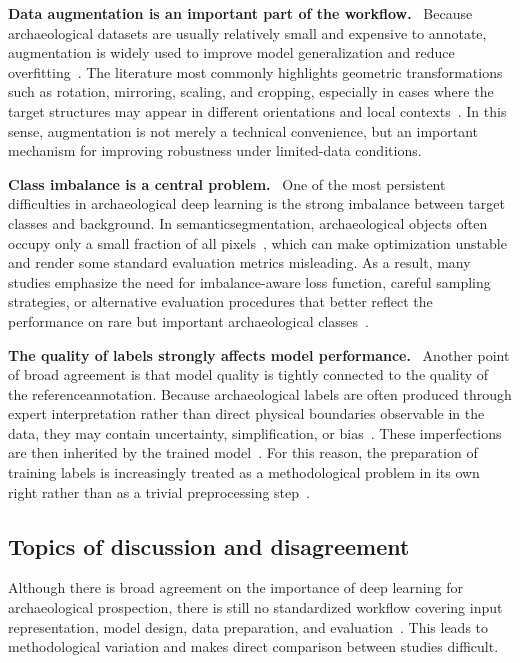 \textbf{Data augmentation is an important part of the workflow.}~\cite{zhang_unveiling_2024,guyot_objective_2021}
Because archaeological datasets are usually relatively small and expensive to annotate, augmentation is widely used to improve model generalization and reduce overfitting~\cite{guyot_objective_2021,diakogiannis_resunet-_2020}. The literature most commonly highlights geometric transformations such as rotation, mirroring, scaling, and cropping, especially in cases where the target structures may appear in different orientations and local contexts~\cite{zhang_unveiling_2024,trier_using_2019}. In this sense, augmentation is not merely a technical convenience, but an important mechanism for improving robustness under limited-data conditions.

\textbf{Class imbalance is a central problem.}~\cite{zhang_unveiling_2024,zhou_dynamic_2023}
One of the most persistent difficulties in archaeological deep learning is the strong imbalance between target classes and background. In \gls{semanticsegmentation}, archaeological objects often occupy only a small fraction of all pixels~\cite{zhang_unveiling_2024,griffiths_improving_2019}, which can make optimization unstable and render some standard evaluation metrics misleading. As a result, many studies emphasize the need for imbalance-aware loss function, careful sampling strategies, or alternative evaluation procedures that better reflect the performance on rare but important archaeological classes~\cite{azarkhordad_detecting_2025,fiorucci_deep_2022}.

\textbf{The quality of labels strongly affects model performance.}~\cite{griffiths_improving_2019,bundzel_semantic_2020}
Another point of broad agreement is that model quality is tightly connected to the quality of the \gls{referenceannotation}. Because archaeological labels are often produced through expert interpretation rather than direct physical boundaries observable in the data, they may contain uncertainty, simplification, or bias~\cite{cowley_what_2016,bundzel_semantic_2020}. These imperfections are then inherited by the trained model~\cite{rahaman_effects_2022,burgert_effects_2022}. For this reason, the preparation of training labels is increasingly treated as a methodological problem in its own right rather than as a trivial preprocessing step~\cite{Quintus_Day_Smith_2017,bundzel_semantic_2020}.

\subsection{Topics of discussion and disagreement}
Although there is broad agreement on the importance of deep learning for archaeological prospection, there is still no standardized workflow covering input representation, model design, data preparation, and evaluation~\cite{kokalj_standardizing_2025,fiorucci_deep_2022}. This leads to methodological variation and makes direct comparison between studies difficult.

